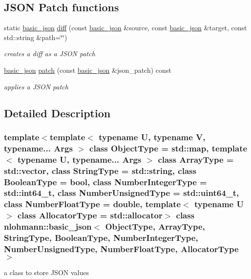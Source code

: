 \subsection*{J\+S\+ON Patch functions}
\begin{DoxyCompactItemize}
\item 
static \hyperlink{classnlohmann_1_1basic__json}{basic\+\_\+json} \hyperlink{classnlohmann_1_1basic__json_a5ef1934868b90452a4a34695489c60cd}{diff} (const \hyperlink{classnlohmann_1_1basic__json}{basic\+\_\+json} \&source, const \hyperlink{classnlohmann_1_1basic__json}{basic\+\_\+json} \&target, const std\+::string \&path=\char`\"{}\char`\"{})
\begin{DoxyCompactList}\small\item\em creates a diff as a J\+S\+ON patch \end{DoxyCompactList}\item 
\hyperlink{classnlohmann_1_1basic__json}{basic\+\_\+json} \hyperlink{classnlohmann_1_1basic__json_aff9d131320db407da31304fb2b5cb7a5}{patch} (const \hyperlink{classnlohmann_1_1basic__json}{basic\+\_\+json} \&json\+\_\+patch) const
\begin{DoxyCompactList}\small\item\em applies a J\+S\+ON patch \end{DoxyCompactList}\end{DoxyCompactItemize}


\subsection{Detailed Description}
\subsubsection*{template$<$template$<$ typename U, typename V, typename... Args $>$ class Object\+Type = std\+::map, template$<$ typename U, typename... Args $>$ class Array\+Type = std\+::vector, class String\+Type = std\+::string, class Boolean\+Type = bool, class Number\+Integer\+Type = std\+::int64\+\_\+t, class Number\+Unsigned\+Type = std\+::uint64\+\_\+t, class Number\+Float\+Type = double, template$<$ typename U $>$ class Allocator\+Type = std\+::allocator$>$\newline
class nlohmann\+::basic\+\_\+json$<$ Object\+Type, Array\+Type, String\+Type, Boolean\+Type, Number\+Integer\+Type, Number\+Unsigned\+Type, Number\+Float\+Type, Allocator\+Type $>$}

a class to store J\+S\+ON values 


